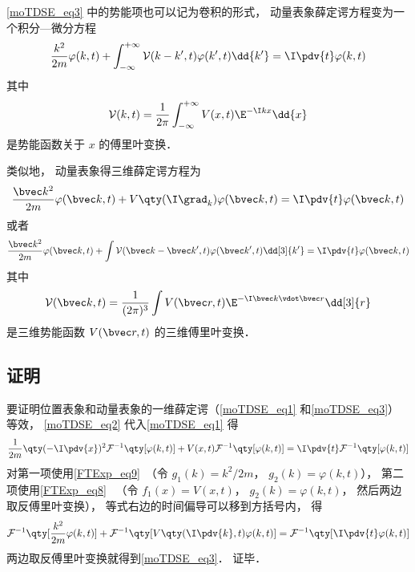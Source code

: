 \autoref{moTDSE_eq3} 中的势能项也可以记为卷积的形式， 动量表象薛定谔方程变为一个积分—微分方程
\begin{equation}\label{moTDSE_eq4}
\frac{k^2}{2m}\varphi(k, t) + \int_{-\infty}^{+\infty} \mathcal{V}(k-k', t) \varphi(k', t) \dd{k'} = \I \pdv{t} \varphi(k,t)
\end{equation}
其中
\begin{equation}
\mathcal{V}(k, t) = \frac{1}{2\pi}\int_{-\infty}^{+\infty} V(x,t)\E^{-\I kx}\dd{x}
\end{equation}
是势能函数关于 $x$ 的傅里叶变换．

类似地， 动量表象得三维薛定谔方程为
\begin{equation}
\frac{\bvec k^2}{2m}\varphi(\bvec k, t) + V\qty(\I \grad_k)\varphi(\bvec k, t) = \I \pdv{t} \varphi(\bvec k,t)
\end{equation}
或者
\begin{equation}
\frac{\bvec k^2}{2m}\varphi(\bvec k, t) + \int \mathcal{V}(\bvec k-\bvec k', t) \varphi(\bvec k', t)\dd[3]{k'} = \I \pdv{t} \varphi(\bvec k,t)
\end{equation}
其中
\begin{equation}
\mathcal{V}(\bvec k, t) = \frac{1}{(2\pi)^{3}} \int V(\bvec r, t) \E^{-\I \bvec k \vdot \bvec r}\dd[3]{r}
\end{equation}
是三维势能函数 $V(\bvec r, t)$ 的三维傅里叶变换． %

\subsection{证明}
要证明位置表象和动量表象的一维薛定谔（\autoref{moTDSE_eq1} 和\autoref{moTDSE_eq3}）等效， \autoref{moTDSE_eq2} 代入\autoref{moTDSE_eq1} 得
\begin{equation}\label{moTDSE_eq5}
\frac{1}{2m}\qty(-\I\pdv{x})^2 \mathcal{F}^{-1}\qty[\varphi(k, t)] + V(x, t)\mathcal{F}^{-1}\qty[\varphi(k, t)] = \I \pdv{t}\mathcal{F}^{-1}\qty[\varphi(k, t)]
\end{equation}
对第一项使用\autoref{FTExp_eq9}~（令 $g_1(k) = k^2/2m$， $g_2(k) = \varphi(k, t)$）， 第二项使用\autoref{FTExp_eq8}~ （令 $f_1(x) = V(x, t)$， $g_2(k) = \varphi(k, t)$， 然后两边取反傅里叶变换）， 等式右边的时间偏导可以移到方括号内， 得
\begin{equation}
\mathcal{F}^{-1}\qty[\frac{k^2}{2m}\varphi(k,t)] + \mathcal{F}^{-1}\qty[V\qty(\I \pdv{k}, t)\varphi(k,t)] = \mathcal{F}^{-1}\qty[\I \pdv{t}\varphi(k,t)]
\end{equation}
两边取反傅里叶变换就得到\autoref{moTDSE_eq3}． 证毕．

